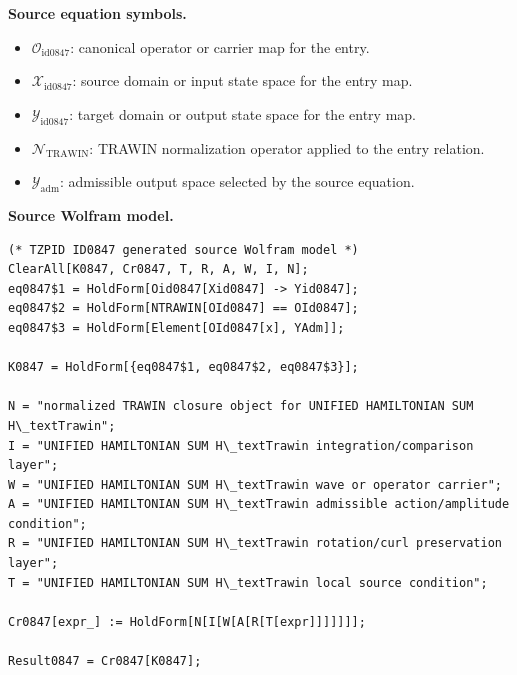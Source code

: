 \begin{minipage}[t]{0.49\linewidth}
\begingroup
\small
\raggedright
\textbf{Source equation symbols.}\par
\begin{itemize}[leftmargin=1.35em,itemsep=1pt,topsep=1pt,parsep=0pt]
    \item $\mathcal{O}_{\mathrm{id0847}}$: canonical operator or carrier map for the entry.
    \item $\mathcal{X}_{\mathrm{id0847}}$: source domain or input state space for the entry map.
    \item $\mathcal{Y}_{\mathrm{id0847}}$: target domain or output state space for the entry map.
    \item $\mathcal{N}_{\mathrm{TRAWIN}}$: TRAWIN normalization operator applied to the entry relation.
    \item $\mathcal{Y}_{\mathrm{adm}}$: admissible output space selected by the source equation.
\end{itemize}
\endgroup
\end{minipage}\hfill
\begin{minipage}[t]{0.47\linewidth}
\begingroup
\scriptsize
\raggedright
\textbf{Source Wolfram model.}\par
\begin{Verbatim}[fontsize=\tiny,breaklines=true,breakanywhere=true]
(* TZPID ID0847 generated source Wolfram model *)
ClearAll[K0847, Cr0847, T, R, A, W, I, N];
eq0847$1 = HoldForm[Oid0847[Xid0847] -> Yid0847];
eq0847$2 = HoldForm[NTRAWIN[OId0847] == OId0847];
eq0847$3 = HoldForm[Element[OId0847[x], YAdm]];

K0847 = HoldForm[{eq0847$1, eq0847$2, eq0847$3}];

N = "normalized TRAWIN closure object for UNIFIED HAMILTONIAN SUM H\_textTrawin";
I = "UNIFIED HAMILTONIAN SUM H\_textTrawin integration/comparison layer";
W = "UNIFIED HAMILTONIAN SUM H\_textTrawin wave or operator carrier";
A = "UNIFIED HAMILTONIAN SUM H\_textTrawin admissible action/amplitude condition";
R = "UNIFIED HAMILTONIAN SUM H\_textTrawin rotation/curl preservation layer";
T = "UNIFIED HAMILTONIAN SUM H\_textTrawin local source condition";

Cr0847[expr_] := HoldForm[N[I[W[A[R[T[expr]]]]]]];

Result0847 = Cr0847[K0847];
\end{Verbatim}
\endgroup
\end{minipage}

